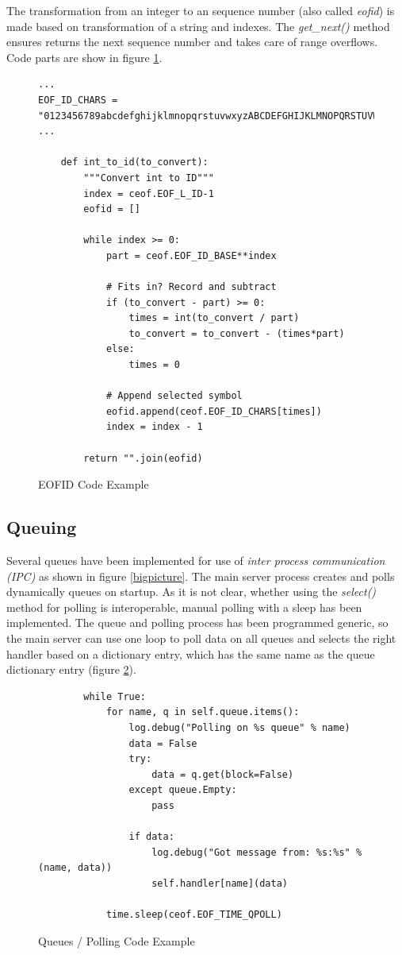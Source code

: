 The transformation from an integer to an sequence 
number (also called \textit{eofid}) is made based on transformation
of a string and indexes. The \textit{get\_next()} method ensures returns
the next sequence number and takes care of range overflows.
Code parts are show in figure \ref{eofid}.
\begin{figure}[htbp][htb]
\caption{EOFID Code Example}
\label{eofid}
\begin{verbatim}
...
EOF_ID_CHARS = "0123456789abcdefghijklmnopqrstuvwxyzABCDEFGHIJKLMNOPQRSTUVWXYZ-!"
...

    def int_to_id(to_convert):
        """Convert int to ID"""
        index = ceof.EOF_L_ID-1
        eofid = []

        while index >= 0:
            part = ceof.EOF_ID_BASE**index

            # Fits in? Record and subtract
            if (to_convert - part) >= 0:
                times = int(to_convert / part)
                to_convert = to_convert - (times*part)
            else:
                times = 0 

            # Append selected symbol
            eofid.append(ceof.EOF_ID_CHARS[times])
            index = index - 1 

        return "".join(eofid)
\end{verbatim}
\end{figure}
\subsection{Queuing}
Several queues have been implemented for use of 
\textit{inter process communication (IPC)} as shown in figure \ref{bigpicture}.
The main server process creates and polls dynamically queues on startup.
As it is not clear, whether using the \textit{select()} method
for polling is interoperable, manual polling with a sleep has been 
implemented. The queue and polling process
has been programmed generic, so the main server can use one loop
to poll data on all queues and selects the right handler based on
a dictionary entry, which has the same name as the queue dictionary
entry (figure \ref{queuepoll}).
\begin{figure}[htbp][htb]
\caption{Queues / Polling Code Example}
\label{queuepoll}
\begin{verbatim}
        while True:
            for name, q in self.queue.items():
                log.debug("Polling on %s queue" % name)
                data = False
                try:
                    data = q.get(block=False)
                except queue.Empty:
                    pass

                if data:
                    log.debug("Got message from: %s:%s" % (name, data))
                    self.handler[name](data)

            time.sleep(ceof.EOF_TIME_QPOLL)
\end{verbatim}
\end{figure}
